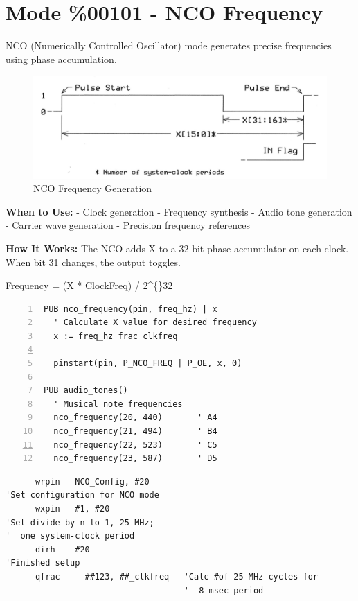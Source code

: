 \documentclass[11pt,a4paper,oneside,english]{book}
\begin{document}
\clearpage

\hypertarget{mode-00101---nco-frequency}{%
\section{Mode \%00101 - NCO
Frequency}\label{mode-00101---nco-frequency}}

NCO (Numerically Controlled Oscillator) mode generates precise
frequencies using phase accumulation.

\begin{figure}
\centering
\includegraphics{assets/P2 SmartPins-220809_page15_img01.png}
\caption{NCO Frequency Generation}
\end{figure}

\textbf{When to Use:} - Clock generation - Frequency synthesis - Audio
tone generation - Carrier wave generation - Precision frequency
references

\textbf{How It Works:} The NCO adds X to a 32-bit phase accumulator on
each clock. When bit 31 changes, the output toggles.

Frequency = (X * ClockFreq) / 2\^{}\{\}32

\begin{Spin2Block}
\begin{Verbatim}[numbers=left,numbersep=5pt,xleftmargin=15pt]
PUB nco_frequency(pin, freq_hz) | x
  ' Calculate X value for desired frequency
  x := freq_hz frac clkfreq
  
  pinstart(pin, P_NCO_FREQ | P_OE, x, 0)
  
PUB audio_tones()
  ' Musical note frequencies
  nco_frequency(20, 440)       ' A4
  nco_frequency(21, 494)       ' B4
  nco_frequency(22, 523)       ' C5
  nco_frequency(23, 587)       ' D5
\end{Verbatim}
\end{Spin2Block}

\begin{PASM2Block}
\begin{lstlisting}
      wrpin   NCO_Config, #20
'Set configuration for NCO mode
      wxpin   #1, #20
'Set divide-by-n to 1, 25-MHz;
'  one system-clock period
      dirh    #20
'Finished setup
      qfrac     ##123, ##_clkfreq   'Calc #of 25-MHz cycles for
                                    '  8 msec period
\end{lstlisting}
\end{PASM2Block}
\end{document}
